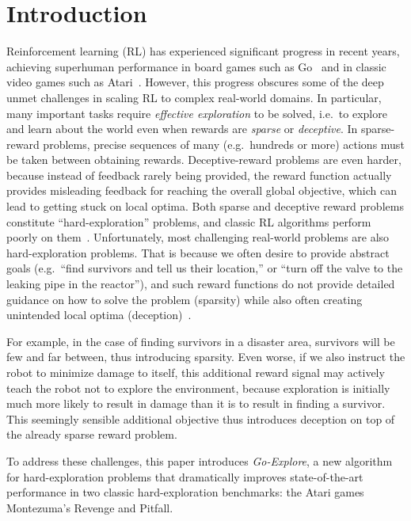 \documentclass{article}
\begin{document}
\section{Introduction} \label{intro} 

Reinforcement learning (RL) has experienced significant progress in recent years, achieving
superhuman performance in board games such as Go~\cite{silver2016mastering,Silver2017MasteringTG} and in classic video games such as Atari~\cite{mnih:nature15}. However, this progress obscures some of the deep unmet challenges in scaling RL to complex real-world domains. In particular, many important tasks require \emph{effective exploration} to be solved, i.e.\ to explore and learn about the world even when rewards are \emph{sparse} or \emph{deceptive}. In sparse-reward problems, precise sequences of many (e.g.\ hundreds or more) actions must be taken between obtaining rewards. Deceptive-reward problems are even harder, because instead of feedback rarely being provided, the reward function actually provides misleading feedback for reaching the overall global objective, which can lead to getting stuck on local optima. Both sparse and deceptive reward problems constitute ``hard-exploration'' problems, and classic RL algorithms perform poorly on them~\cite{bellemare2016unifying}. Unfortunately, most challenging real-world problems are also hard-exploration problems. That is because we often desire to provide abstract goals (e.g.\ ``find survivors and tell us their location,'' or ``turn off the valve to the leaking pipe in the reactor''), and such reward functions do not provide detailed guidance on how to solve the problem (sparsity) while also often creating unintended local optima (deception)~\cite{Amodei2016ConcretePI,Lehman2018TheSC,lehman,Chrabaszcz2018BackTB}.

For example, in the case of finding survivors in a disaster area, survivors will be few and far between, thus introducing sparsity. Even worse, if we also instruct the robot to minimize damage to itself, this additional reward signal may actively teach the robot not to explore the environment, because exploration is initially much more likely to result in damage than it is to result in finding a survivor. This seemingly sensible additional objective thus introduces deception on top of the already sparse reward problem.

To address these challenges, this paper introduces \emph{Go-Explore}, a new algorithm for hard-exploration problems
that dramatically improves state-of-the-art performance in two classic hard-exploration
benchmarks: the Atari games Montezuma's Revenge and Pitfall.
\end{document}
